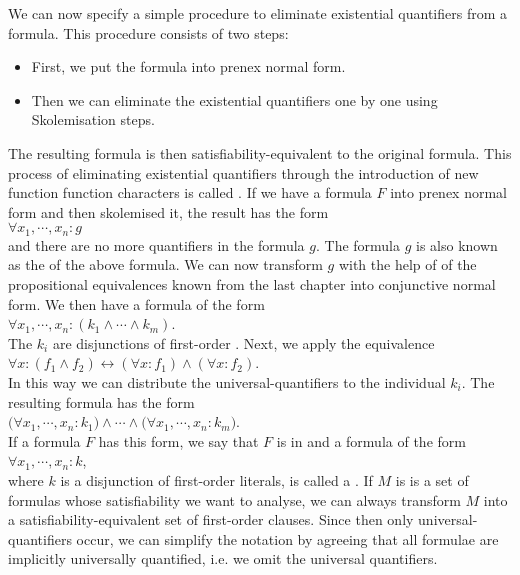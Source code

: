 We can now specify a simple procedure to eliminate existential quantifiers from a formula.  This procedure
consists of two steps:
\begin{itemize}
\item First, we put the formula into prenex normal form. 
\item Then we can eliminate the existential quantifiers one by one using Skolemisation steps.
\end{itemize}
The resulting formula is then satisfiability-equivalent to the original formula.  This
process of eliminating existential quantifiers through the introduction of new function
function characters is called .  If we have a formula $F$
into prenex normal form and then skolemised it, the result has the form\\[0.2cm]
\hspace*{1.3cm} $\forall x_1, \cdots, x_n: g$ \\[0.2cm]
and there are no more quantifiers in the formula $g$.  The formula $g$ is also known as the
 of the above formula.  We can now transform $g$ with the help of
of the propositional equivalences known from the last chapter into conjunctive normal form.  We then have a
formula of the form \\[0.2cm]
\hspace*{1.3cm} $\forall x_1, \cdots, x_n: (k_1 \wedge \cdots \wedge k_m)$. \\[0.2cm]
The $k_i$ are disjunctions of first-order .  Next, we apply  the equivalence 
\\[0.2cm]
\hspace*{1.3cm}
$\forall x\colon (f_1\wedge f_2) \leftrightarrow (\forall x\colon f_1) \wedge (\forall x\colon f_2)$.
\\[0.2cm]
In this way we can distribute the universal-quantifiers to the individual $k_i$.
The resulting formula has the form \\[0.2cm]
\hspace*{1.3cm} 
$\big(\forall x_1, \cdots, x_n: k_1\big) \wedge \cdots \wedge \big(\forall x_1, \cdots, x_n: k_m\big)$.
\\[0.2cm]
If a formula $F$ has this form, we say that $F$ is in 
 and a formula of the form \\[0.2cm]
\hspace*{1.3cm} $\forall x_1, \cdots, x_n: k$, \\[0.2cm]
where $k$ is a disjunction of first-order literals,
is called a .   If $M$ is
is a set of formulas whose satisfiability we want to analyse, 
we can always transform $M$ into a satisfiability-equivalent set of first-order clauses.
Since then only universal-quantifiers occur, we can simplify the notation
by agreeing that all formulae are implicitly universally quantified, i.e. we omit
the universal quantifiers.


